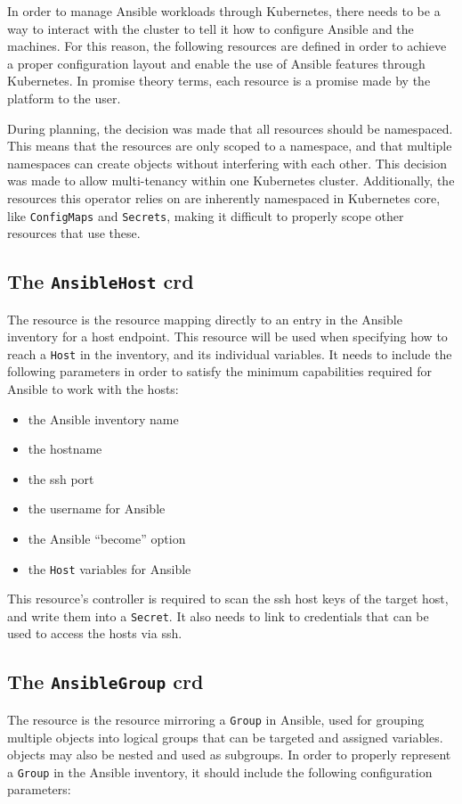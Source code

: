 In order to manage Ansible workloads through Kubernetes, there needs to be a way to interact with the cluster to tell it how to configure Ansible and the machines.
For this reason, the following resources are defined in order to achieve a proper configuration layout and enable the use of Ansible features through Kubernetes.
In promise theory terms, each resource is a promise made by the platform to the user.

\clearpage
During planning, the decision was made that all resources should be namespaced.
This means that the resources are only scoped to a namespace, and that multiple namespaces can create objects without interfering with each other.
This decision was made to allow multi-tenancy within one Kubernetes cluster.
Additionally, the resources this operator relies on are inherently namespaced in Kubernetes core, like \texttt{ConfigMaps} and \texttt{Secrets}, making it difficult to properly scope other resources that use these.

\subsection{The \texttt{AnsibleHost} \gls{crd}}
The \anhost resource is the resource mapping directly to an entry in the Ansible inventory for a host endpoint.
This resource will be used when specifying how to reach a \texttt{Host} in the inventory, and its individual variables.
It needs to include the following parameters in order to satisfy the minimum capabilities required for Ansible to work with the hosts:

\begin{itemize}
	\item{the Ansible inventory name}
	\item{the hostname}
	\item{the \gls{ssh} port}
	\item{the username for Ansible}
	\item{the Ansible \enquote{become} option}
	\item{the \texttt{Host} variables for Ansible}
\end{itemize}

This resource's controller is required to scan the \gls{ssh} host keys of the target host, and write them into a \texttt{Secret}.
It also needs to link to credentials that can be used to access the hosts via \gls{ssh}.

\subsection{The \texttt{AnsibleGroup} \gls{crd}}
The \angroup resource is the resource mirroring a \texttt{Group} in Ansible, used for grouping multiple \anhost objects into logical groups that can be targeted and assigned variables.
\angroup objects may also be nested and used as subgroups.
In order to properly represent a \texttt{Group} in the Ansible inventory, it should include the following configuration parameters:

